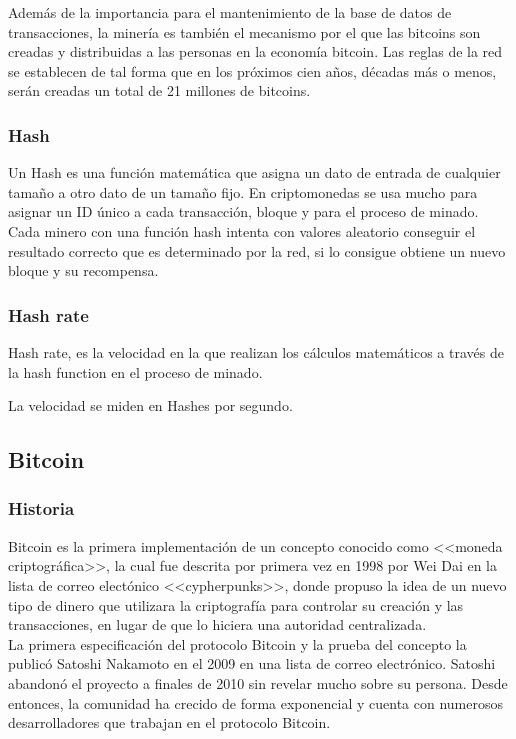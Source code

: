 \documentclass[12pt,letterpaper]{article}
\begin{document}
Adem\'as de la importancia para el mantenimiento de la base de datos de transacciones, la miner\'ia es tambi\'en el mecanismo por el que las bitcoins son creadas y distribuidas a las personas en la econom\'ia bitcoin. Las reglas de la red se establecen de tal forma que en los pr\'oximos cien años, d\'ecadas m\'as o menos, ser\'an creadas un total de 21 
millones de bitcoins. 
\\

\subsubsection*{Hash}
Un Hash es una función matemática que asigna un dato de entrada de cualquier tamaño a otro dato de un tamaño fijo. En criptomonedas se usa mucho para asignar un ID único a cada transacción, bloque y para el proceso de minado. Cada minero con una función hash intenta con valores aleatorio conseguir el resultado correcto que es determinado por la red, si lo consigue obtiene un nuevo bloque y su recompensa.

	
    \subsubsection*{Hash rate}
    Hash rate, es la velocidad en la que realizan los cálculos matemáticos a través de la hash function en el proceso de minado.

La velocidad se miden en Hashes por segundo.

	\subsection*{Bitcoin}
        \subsubsection*{Historia}
        
Bitcoin es la primera implementaci\'on de un concepto conocido como <<moneda criptogr\'afica>>, la cual fue descrita por primera vez en 1998 por Wei Dai en la lista de correo elect\'onico <<cypherpunks>>, donde propuso la idea de un nuevo tipo de dinero que utilizara la criptograf\'ia para controlar su creaci\'on y las transacciones, en lugar de que lo hiciera una autoridad centralizada.
\\

 La primera especificaci\'on del protocolo Bitcoin y la prueba del concepto la public\'o Satoshi Nakamoto en el 2009 en una lista de correo electr\'onico. Satoshi abandon\'o el proyecto a finales de 2010 sin revelar mucho sobre su persona. Desde entonces, la comunidad ha crecido de forma exponencial y cuenta con numerosos desarrolladores que trabajan en el protocolo Bitcoin.
\\
\end{document}
